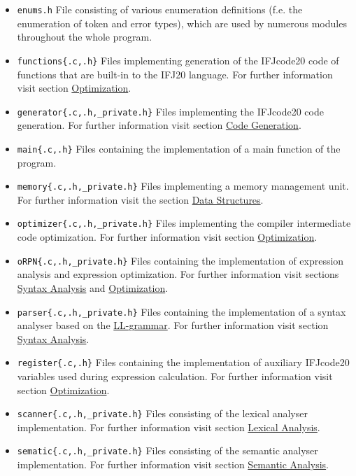 \documentclass[12pt]{article}
\begin{document}
\begin{itemize}
	\item \texttt{enums.h} File consisting of various enumeration definitions (f.e. the enumeration of token and error types), which are used by numerous modules throughout the whole program.
	\item \texttt{functions\{.c,.h\}} Files implementing generation of the IFJcode20 code of functions that are built-in to the IFJ20 language. For further information visit section \hyperref[sec:optimization]{Optimization}.
	\item \texttt{generator\{.c,.h,\_private.h\}} Files implementing the IFJcode20 code generation. For further information visit section \hyperref[sec:generation]{Code Generation}.
	\item \texttt{main\{.c,.h\}} Files containing the implementation of a main function of the program.
	\item \texttt{memory\{.c,.h,\_private.h\}} Files implementing a memory management unit. For further information visit the section \hyperref[sec:datastruct]{Data Structures}.
	\item \texttt{optimizer\{.c,.h,\_private.h\}} Files implementing the compiler intermediate code optimization. For further information visit section \hyperref[sec:optimization]{Optimization}.
	\item \texttt{oRPN\{.c,.h,\_private.h\}} Files containing the implementation of expression analysis and expression optimization. For further information visit sections \hyperref[sec:syntaxanalyser]{Syntax Analysis} and \hyperref[sec:optimization]{Optimization}.
		\item \texttt{parser\{.c,.h,\_private.h\}} Files containing the implementation of a syntax analyser based on the \hyperref[sec:llgrammar]{LL-grammar}. For further information visit section \hyperref[sec:syntaxanalyser]{Syntax Analysis}.
    \item \texttt{register\{.c,.h\}} Files containing the implementation of auxiliary IFJcode20 variables used during expression calculation. For further information visit section \hyperref[sec:optimization]{Optimization}.
    \item \texttt{scanner\{.c,.h,\_private.h\}} Files consisting of the lexical analyser implementation. For further information visit section \hyperref[sec:lexanalyser]{Lexical Analysis}.
   	\item \texttt{sematic\{.c,.h,\_private.h\}} Files
consisting of the semantic analyser implementation. For further information visit section \hyperref[sec:semanalysis]{Semantic Analysis}.

\end{itemize}
\end{document}
